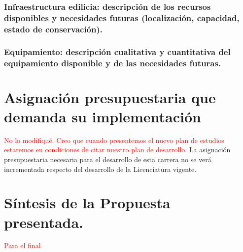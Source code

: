 \documentclass[a4paper, 12pt]{article}
\begin{document}
\subsubsection{Infraestructura edilicia: descripción de los recursos disponibles y necesidades futuras (localización, capacidad, estado de conservación).} 
\subsubsection{Equipamiento: descripción cualitativa y cuantitativa del equipamiento disponible y de las necesidades futuras.}



\section{Asignación presupuestaria que demanda su
implementación}
\textcolor{red}{No lo modifiqué. Creo que cuando presentemos el nuevo plan de estudios estaremos en condiciones de citar nuestro plan de desarrollo.}
La asignación presupuestaria necesaria para el desarrollo de esta
carrera no se verá incrementada respecto del desarrollo de la
Licenciatura vigente.


\section{Síntesis de la Propuesta presentada. }

\textcolor{red}{Para el final}





\end{document}
